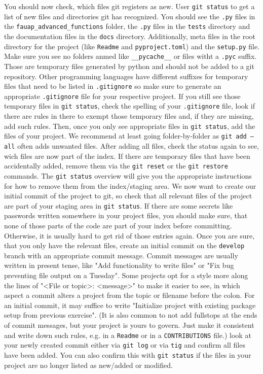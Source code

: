\documentclass[]{erlangen-problemset}
\begin{document}
\begin{problem}[title={Setting up a git repository the simple way}]
\Question You should now check, which files git registers as new. User \texttt{git status} to get a list of new files and directories git has recognized. 
You should see the \texttt{.py} files in the \texttt{fauap\_advanced\_functions} folder, the \texttt{.py} files in the \texttt{tests} directory and the documentation files in the \texttt{docs} directory. 
Additionally, meta files in the root directory for the project (like \texttt{Readme} and \texttt{pyproject.toml}) and the \texttt{setup.py} file. 
Make sure you see no folders anmed like \texttt{\_\_pycache\_\_} or files witht a \texttt{.pyc} suffix. Those are temporary files generated by python and should not be added to a git repository. 
Other programming languages have different suffixes for temporary files that need to be listed in \texttt{.gitignore} so make sure to generate an appropriate \texttt{.gitignore} file for your respective project. 
If you still see those temporary files in \texttt{git status}, check the spelling of your \texttt{.gitignore} file, look if there are rules in there to exempt those temporary files and, if they are missing, add such rules. 
Then, once you only see appropriate files in \texttt{git status}, add the files of your project. 
We recommend at least going folder-by-folder as \texttt{git add --all} often adds unwanted files. 
After adding all files, check the status again to see, wich files are now part of the index. 
If there are temporary files that have been accidentally added, remove them via the \texttt{git reset} or the \texttt{git restore} commands. 
The \texttt{git status} overview will give you the appropriate instructions for how to remove them from the index/staging area. 
\Question We now want to create our initial commit of the project to git, so check that all relevant files of the project are part of your staging area in \texttt{git status}.
If there are some secrets like passwords written somewhere in your project files, you should make sure, that none of those parts of the code are part of your index before committing. 
Otherwise, it is usually hard to get rid of those entries again. 
Once you are sure, that you only have the relevant files, create an initial commit on the \texttt{develop} branch with an appropriate commit message. 
Commit messages are usually written in present tense, like "Add functionality to write files" or "Fix bug preventing file output on a Tuesday". 
Some projects opt for a style more along the lines of "<File or topic>: <message>" to make it easier to see, in which aspect a commit alters a project from the topic or filename before the colon. 
For an initial commit, it may suffice to write "Initialize project with existing package setup from previous exercise".
(It is also common to not add fullstops at the ends of commit messages, but your project is yours to govern. Just make it consistent and write down such rules, e.g. in a \texttt{Readme} or in a \texttt{CONTRIBUTIONS} file.)
\Question look at your newly created commit either via \texttt{git log} or via \texttt{tig} and confirm all files have been added. 
You can also confirm this with \texttt{git status} if the files in your project are no longer listed as new/added or modified.
\end{problem}
\end{document}
